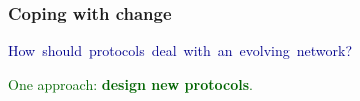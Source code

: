 \documentclass[svgnames]{beamer}
\begin{document}
\begin{frame}
\begin{columns}
\begin{column}{0.5\textwidth}
\end{column}

\begin{column}{0.5 \textwidth}

\begin{itemize}






\end{itemize}

\end{column}

\end{columns}

\end{frame}

\begin{frame}
\frametitle{Coping with change}

\Large

\mbox{\textcolor{DarkBlue}{How should protocols deal with an evolving network?}}

\vspace{\baselineskip}
\vspace{\baselineskip}

\textcolor{DarkGreen}{One approach: \textbf{design new protocols}.}

\end{frame}
\end{document}
